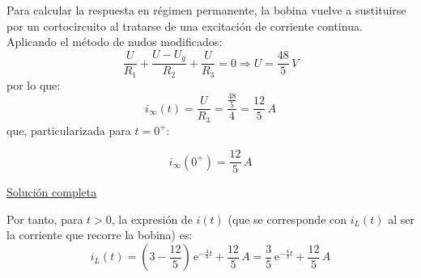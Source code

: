 \begin{example}
	    Para calcular la respuesta en régimen permanente, la bobina vuelve a sustituirse por un cortocircuito al tratarse de una excitación de corriente continua. Aplicando el método de nudos modificados:
	    \begin{equation*}
	        \dfrac{U}{R_1}+\dfrac{U-U_g}{R_2}+\dfrac{U}{R_3}=0\Rightarrow U=\dfrac{48}{5}\,V
	    \end{equation*}
	    por lo que:
	    \begin{equation*}
	        i_\infty(t)=\dfrac{U}{R_3}=\dfrac{\frac{48}{5}}{4}=\dfrac{12}{5}\,A
	    \end{equation*}
	    que, particularizada para $t=0^+$:
	    
	    \begin{equation*}
	        i_\infty(0^+)=\dfrac{12}{5}\,A
	    \end{equation*}
	    
	    \underline{Solución completa}
	    
	    Por tanto, para $t>0$, la expresión de $i(t)$ (que se corresponde con $i_L(t)$ al ser la corriente que recorre la bobina) es:
	    \begin{equation*}
	        i_L(t)=\left(3-\dfrac{12}{5}\right)\,\mathrm{e}^{-\frac{4}{3}t}+\dfrac{12}{5}\,A=\dfrac{3}{5}\,\mathrm{e}^{-\frac{4}{3}t}+\dfrac{12}{5}\,A
	    \end{equation*}
	\end{example}
	

